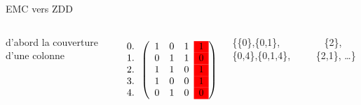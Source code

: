 \documentclass{beamer}
\let\emph\alert
\begin{document}
\begin{frame}{EMC vers ZDD}
  \begin{columns}

    d'abord la couverture d'\emph{une} colonne

    \bigskip

  \begin{displaymath}
    \begin{array}{c}
      0. \\ 1. \\ 2. \\ 3. \\ 4.
    \end{array}
   \left(\begin{array}{ c c c c c }
   1 & 0 & 1 &\cellcolor{red} 1 \\
   0 & 1 & 1 &\cellcolor{red} 0 \\
   1 & 1 & 0 &\cellcolor{red} 1 \\
   1 & 0 & 0 &\cellcolor{red} 1 \\
   0 & 1 & 0 &\cellcolor{red} 0
  \end{array}\right)
  \end{displaymath}

  \bigskip
  \{\{0\},\{0,1\},\{0,4\},\{0,1,4\}, \par
  ~ \{2\},\{2,1\}, \dots \}


\end{columns}
\end{frame}
\end{document}
